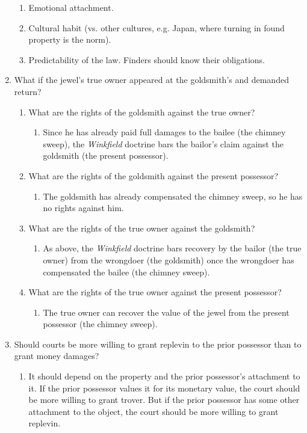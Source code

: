 \begin{enumerate}
\begin{enumerate}
        \item Emotional attachment.
        \item Cultural habit (vs. other cultures, e.g. Japan, where turning in 
        found property is the norm).
        \item Predictability of the law. Finders should know their 
        obligations.
    \end{enumerate}
    \item What if the jewel's true owner appeared at the goldsmith's and 
    demanded return?
    \begin{enumerate}
        \item What are the rights of the goldsmith against the true owner?
        \begin{enumerate}
            \item Since he has already paid full damages to the bailee (the 
            chimney sweep), the \emph{Winkfield} doctrine bars the bailor's 
            claim against the goldsmith (the present possessor).
        \end{enumerate}
        \item What are the rights of the goldsmith against the present 
        possessor?
        \begin{enumerate}
            \item The goldsmith has already compensated the chimney sweep, so 
            he has no rights against him.
        \end{enumerate}
        \item What are the rights of the true owner against the goldsmith?
        \begin{enumerate}
            \item As above, the \emph{Winkfield} doctrine bars recovery by the 
            bailor (the true owner) from the wrongdoer (the goldsmith) once 
            the wrongdoer has compensated the bailee (the chimney sweep).
        \end{enumerate}
        \item What are the rights of the true owner against the present 
        possessor?
        \begin{enumerate}
            \item The true owner can recover the value of the jewel from the 
            present possessor (the chimney sweep).
        \end{enumerate}
    \end{enumerate}
    \item Should courts be more willing to grant replevin to the prior 
    possessor than to grant money damages?
    \begin{enumerate}
        \item It should depend on the property and the prior possessor's 
        attachment to it. If the prior possessor values it for its monetary 
        value, the court should be more willing to grant trover. But if the 
        prior possessor has some other attachment to the object, the court 
        should be more willing to grant replevin.
    \end{enumerate}
\end{enumerate}

